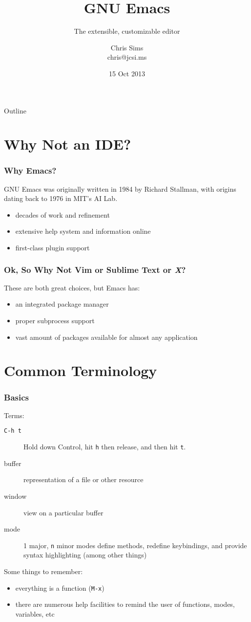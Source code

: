 \documentclass{beamer}
\title{GNU Emacs}
\subtitle{The extensible, customizable editor}
\author{Chris Sims \\ chris@jcsi.ms}
\date{15 Oct 2013}
\begin{document}
\lstset{language=[LaTeX]TeX}
\frame{\titlepage}

\begin{frame}{Outline}
  \tableofcontents
\end{frame}


\section{Why Not an IDE?}
\begin{frame}
  \frametitle{Why Emacs?}  GNU Emacs was originally written in 1984 by
  Richard Stallman, with origins dating back to 1976 in MIT's AI Lab.
  \begin{itemize}
  \item decades of work and refinement
  \item extensive help system and information online
  \item first-class plugin support
  \end{itemize}
\end{frame}

\begin{frame}
  \frametitle{Ok, So Why Not Vim or Sublime Text or {\em X}?}

  These are both great choices, but Emacs has:
  \begin{itemize}
  \item an integrated package manager
  \item proper subprocess support
  \item vast amount of packages available for almost any application
  \end{itemize}

\end{frame}

\section{Common Terminology}
\begin{frame}
  \frametitle{Basics}
  Terms:
  \begin{description}
  \item[\texttt{C-h t}] Hold down Control, hit {\tt h} then release, and then
    hit {\tt t}.
  \item[buffer] representation of a file or other resource
  \item[window] view on a particular buffer
  \item[mode] 1 major, {\tt n} minor modes define methods,
    redefine keybindings, and provide syntax highlighting (among
    other things)
  \end{description}
  Some things to remember:
  \begin{itemize}
  \item everything is a function ({\tt M-x})
  \item there are numerous help facilities to remind the user of functions,
    modes, variables, etc
  \end{itemize}
\end{frame}
\end{document}
